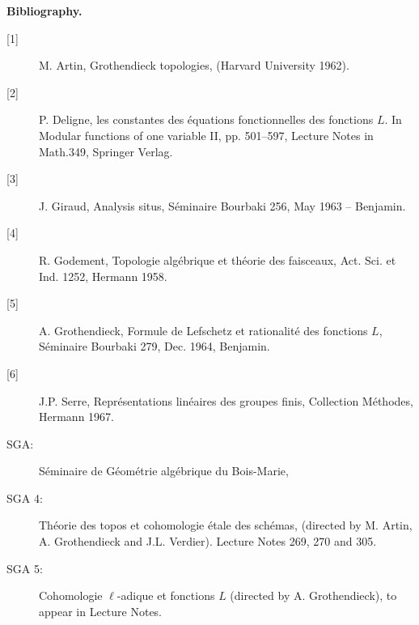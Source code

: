 \begin{center}\textbf{Bibliography.}\end{center}
\begin{description}
\item[{[1]}] M. Artin, Grothendieck topologies, (Harvard University 1962).
\item[{[2]}] P. Deligne, les constantes des équations fonctionnelles des
fonctions $L$. In Modular functions of one variable II, pp. 501--597, Lecture
Notes in Math.349, Springer Verlag.
\item[{[3]}] J. Giraud, Analysis situs, Séminaire Bourbaki 256, May 1963 -- Benjamin.
\item[{[4]}] R. Godement, Topologie algébrique et théorie des faisceaux,
Act. Sci. et Ind. 1252, Hermann 1958.
\item[{[5]}] A. Grothendieck, Formule de Lefschetz et rationalité des fonctions
$L$, Séminaire Bourbaki 279, Dec. 1964, Benjamin.
\item[{[6]}] J.P. Serre, Représentations linéaires des groupes finis,
Collection Méthodes, Hermann 1967.
\end{description}
\begin{description}
\item[SGA:] Séminaire de Géométrie algébrique du Bois-Marie,
\item[SGA 4:] Théorie des topos et cohomologie étale des schémas,
(directed by M. Artin, A. Grothendieck and J.L. Verdier).
Lecture Notes 269, 270 and 305.
\item[SGA 5:] Cohomologie $\ell$-adique et fonctions $L$
(directed by A. Grothendieck), to appear in Lecture Notes.
\end{description}
